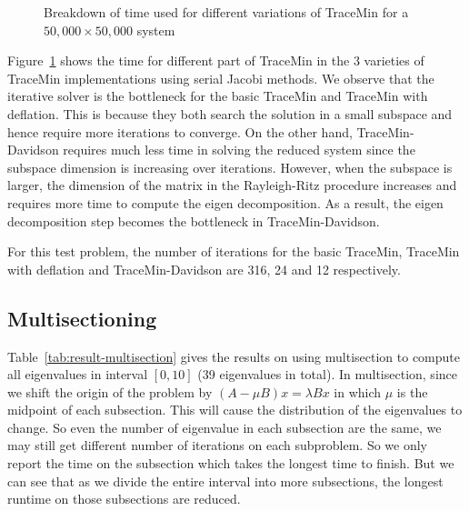 \begin{figure}[htbp]
	\centering
	\caption{Breakdown of time used for different variations of TraceMin for a $50,000 \times 50,000$ system}
  \label{fig:comp}
\end{figure}

Figure~\ref{fig:comp} shows the time for different part of TraceMin in the 3 varieties of TraceMin implementations
using serial Jacobi methods. We observe that the iterative solver is the bottleneck for the basic TraceMin and
TraceMin with deflation. This is because they both search the solution in a small subspace and hence require more
iterations to converge. On the other hand, TraceMin-Davidson requires much less time in solving the reduced system
since the subspace dimension is increasing over iterations. However, when the subspace is larger, the dimension of
the matrix in the Rayleigh-Ritz procedure increases and requires more time to compute the eigen decomposition. As a
result, the eigen decomposition step becomes the bottleneck in TraceMin-Davidson.

For this test problem, the number of iterations for the basic TraceMin, TraceMin with deflation and TraceMin-Davidson
are 316, 24 and 12 respectively.

\subsection{Multisectioning}
Table~\ref{tab:result-multisection} gives the results on using multisection to compute all eigenvalues in interval
$[0, 10]$ (39 eigenvalues in total). In multisection, since we shift the origin of the problem by
$\left(A - \mu B\right) x = \lambda B x$ in which $\mu$ is the midpoint of each subsection. This will cause the
distribution of the eigenvalues to change. So even the number of eigenvalue in each subsection are the same, we may
still get different number of iterations on each subproblem. So we only report the time on the subsection which takes
the longest time to finish. But we can see that as we divide the entire interval into more subsections, the longest
runtime on those subsections are reduced. 

